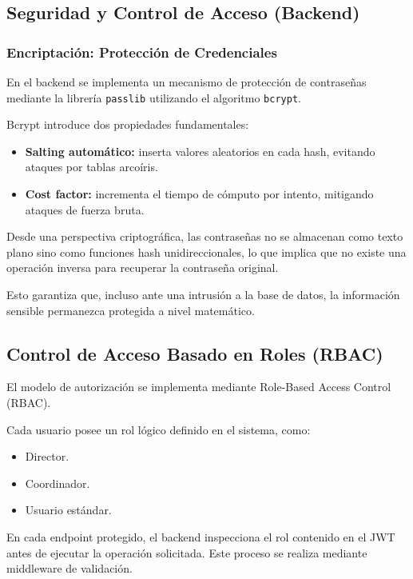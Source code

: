 \documentclass[12pt,letterpaper]{article}
\begin{document}
\subsection*{Seguridad y Control de Acceso (Backend)}

\subsubsection*{Encriptación: Protección de Credenciales}

En el backend se implementa un mecanismo de protección de contraseñas mediante la librería \texttt{passlib} utilizando el algoritmo \texttt{bcrypt}.

Bcrypt introduce dos propiedades fundamentales:

\begin{itemize}
    \item \textbf{Salting automático:} inserta valores aleatorios en cada hash, evitando ataques por tablas arcoíris.
    \item \textbf{Cost factor:} incrementa el tiempo de cómputo por intento, mitigando ataques de fuerza bruta.
\end{itemize}

Desde una perspectiva criptográfica, las contraseñas no se almacenan como texto plano sino como funciones hash unidireccionales, lo que implica que no existe una operación inversa para recuperar la contraseña original.

Esto garantiza que, incluso ante una intrusión a la base de datos, la información sensible permanezca protegida a nivel matemático.

\subsection*{Control de Acceso Basado en Roles (RBAC)}

El modelo de autorización se implementa mediante Role-Based Access Control (RBAC).

Cada usuario posee un rol lógico definido en el sistema, como:

\begin{itemize}
    \item Director.
    \item Coordinador.
    \item Usuario estándar.
\end{itemize}

En cada endpoint protegido, el backend inspecciona el rol contenido en el JWT antes de ejecutar la operación solicitada. Este proceso se realiza mediante middleware de validación.
\end{document}
